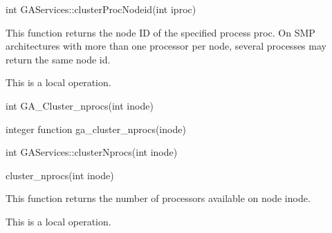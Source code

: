 \documentclass[12pt]{article}
\begin{document}
\begin{cxxapi}
\begin{cxxcode}
int GAServices::clusterProcNodeid(int iproc)
\end{cxxcode}
\begin{funcargs}
\end{funcargs}
\end{cxxapi}

\begin{desc}

This function returns the node ID of the specified process proc. 
On SMP architectures with more than one processor per node, several 
processes may return the same node id.

This is a  local operation.
\end{desc}


\begin{capi}
\begin{ccode}
int GA_Cluster_nprocs(int inode)
\end{ccode}
\begin{funcargs}
\end{funcargs}
\end{capi}

\begin{fapi}
\begin{fcode}
integer function ga_cluster_nprocs(inode)
\end{fcode}
\begin{funcargs}
\end{funcargs}
\end{fapi}

\begin{cxxapi}
\begin{cxxcode}
int GAServices::clusterNprocs(int inode)
\end{cxxcode}
\begin{funcargs}
\end{funcargs}
\end{cxxapi}

\begin{pyapi}
\begin{pycode}
cluster_nprocs(int inode) 
\end{pycode}
\end{pyapi}

\begin{desc}

This function returns the number of processors available on node inode.

This is a local operation.
\end{desc}
\end{document}
